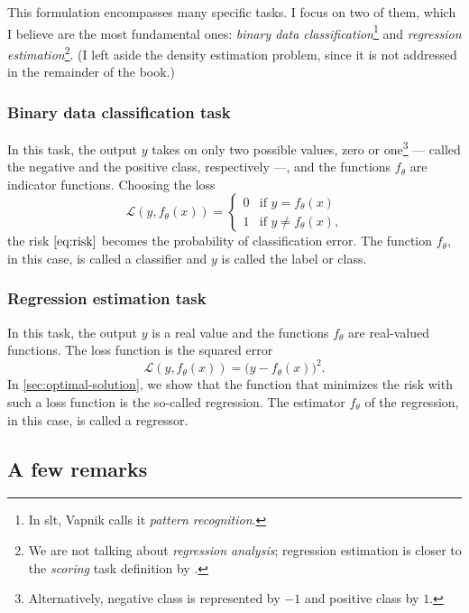 This formulation encompasses many specific tasks. I focus on two of them, which I
believe are the most fundamental ones: \emph{binary data classification}\footnote{In
\gls{slt}, Vapnik calls it \emph{pattern recognition}.} and \emph{regression
estimation}\footnote{We are not talking about \emph{regression analysis}; regression
estimation is closer to the \emph{scoring} task definition by .}.  (I
left aside the density estimation problem, since it is not addressed in the remainder of
the book.)

\subsubsection{Binary data classification task}

In this task, the output $y$ takes on
only two possible values, zero or one\footnote{Alternatively, negative class is
represented by $-1$ and positive class by $1$.} --- called the negative and the positive
class, respectively ---, and the functions $f_\theta$ are indicator
functions. Choosing the \gls{loss}
\begin{equation*}
  \mathcal{L}(y, f_\theta(x)) = \begin{cases}
    0 & \text{if } y = f_\theta(x) \\
    1 & \text{if } y \neq f_\theta(x)\text{,}
  \end{cases}
\end{equation*}
the risk $\eqref{eq:risk}$ becomes the probability of
classification error.  The function $f_\theta$, in this case, is called a \gls{classifier}
and $y$ is called the label or class.

\subsubsection{Regression estimation task}

In this task, the output $y$ is a real value and the functions $f_\theta$ are real-valued
functions.  The \gls{loss} function is the squared error
\[
  \mathcal{L}(y, f_\theta(x)) = \big(y - f_\theta(x)\big)^2\text{.}
\]
In \cref{sec:optimal-solution}, we show that the function that minimizes the risk with such
a \gls{loss} function is the so-called regression.
The estimator $f_\theta$ of the regression, in this case, is called a \gls{regressor}.

\subsection{A few remarks}

